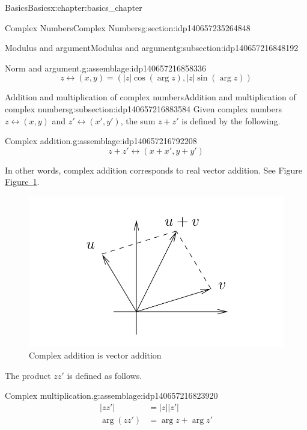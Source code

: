 \documentclass[oneside,10pt,]{book}
\numberwithin{equation}{section}
\newcommand{\amp}{&}
\begin{document}
\begin{chapterptx}{Basics}{}{Basics}{}{}{x:chapter:basics_chapter}
\begin{sectionptx}{Complex Numbers}{}{Complex Numbers}{}{}{g:section:idp140657235264848}
\begin{subsectionptx}{Modulus and argument}{}{Modulus and argument}{}{}{g:subsection:idp140657216848192}
\begin{assemblage}{Norm and argument.}{g:assemblage:idp140657216858336}%
%
\begin{equation}
z\leftrightarrow (x,y) = \left(|z|\cos( \arg{z}),|z|\sin(\arg{z})\right) \label{x:men:normargdef}
\end{equation}
%
\end{assemblage}
\end{subsectionptx}
%
%
\typeout{************************************************}
\typeout{************************************************}
%
\begin{subsectionptx}{Addition and multiplication of complex numbers}{}{Addition and multiplication of complex numbers}{}{}{g:subsection:idp140657216883584}
Given complex numbers \(z\leftrightarrow (x,y)\) and \(z'\leftrightarrow
(x',y')\), the sum \(z+z'\) is defined by the following.%
\begin{assemblage}{Complex addition.}{g:assemblage:idp140657216792208}%
%
\begin{equation}
z+z' \leftrightarrow (x+x',y+y')\label{x:men:complexadddef}
\end{equation}
%
\end{assemblage}
In other words, complex addition corresponds to real vector addition. See Figure \hyperref[x:figure:parallelogramlawfig]{Figure~\ref{x:figure:parallelogramlawfig}}. \begin{figure}
\centering
\includegraphics[width=0.6\linewidth]{images/parallelogramlaw_clip.jpg}
\caption{Complex addition is vector addition\label{x:figure:parallelogramlawfig}}
\end{figure}
%
\par
The product \(zz'\) is defined as follows.%
\begin{assemblage}{Complex multiplication.}{g:assemblage:idp140657216823920}%
%
\begin{align}
|zz'| \amp = |z||z'|\label{x:mrow:complexmultdefnorm}\\
\arg(zz') \amp = \arg{z}+\arg{z'}\label{x:mrow:complexmultdefarg}

\end{align}
\end{assemblage}
\end{subsectionptx}
\end{sectionptx}
\end{chapterptx}
\end{document}

